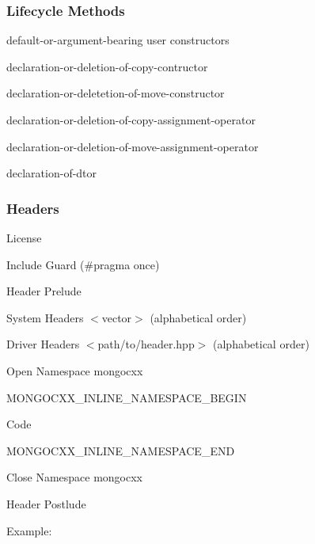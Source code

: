 \subsubsection*{Lifecycle Methods}


\begin{DoxyItemize}
\item default-\/or-\/argument-\/bearing \textquotesingle{}user\textquotesingle{} constructors
\item declaration-\/or-\/deletion-\/of-\/copy-\/contructor
\item declaration-\/or-\/deletetion-\/of-\/move-\/constructor
\item declaration-\/or-\/deletion-\/of-\/copy-\/assignment-\/operator
\item declaration-\/or-\/deletion-\/of-\/move-\/assignment-\/operator
\item declaration-\/of-\/dtor
\end{DoxyItemize}

\subsubsection*{Headers}


\begin{DoxyItemize}
\item License
\item Include Guard ({\ttfamily \#pragma once})
\item Header Prelude
\item System Headers {\ttfamily $<$vector$>$} (alphabetical order)
\item Driver Headers {\ttfamily $<$path/to/header.\+hpp$>$} (alphabetical order)
\item Open Namespace mongocxx
\item {\ttfamily M\+O\+N\+G\+O\+C\+X\+X\+\_\+\+I\+N\+L\+I\+N\+E\+\_\+\+N\+A\+M\+E\+S\+P\+A\+C\+E\+\_\+\+B\+E\+G\+IN}
\item Code
\item {\ttfamily M\+O\+N\+G\+O\+C\+X\+X\+\_\+\+I\+N\+L\+I\+N\+E\+\_\+\+N\+A\+M\+E\+S\+P\+A\+C\+E\+\_\+\+E\+ND}
\item Close Namespace mongocxx
\item Header Postlude
\end{DoxyItemize}

Example\+:


